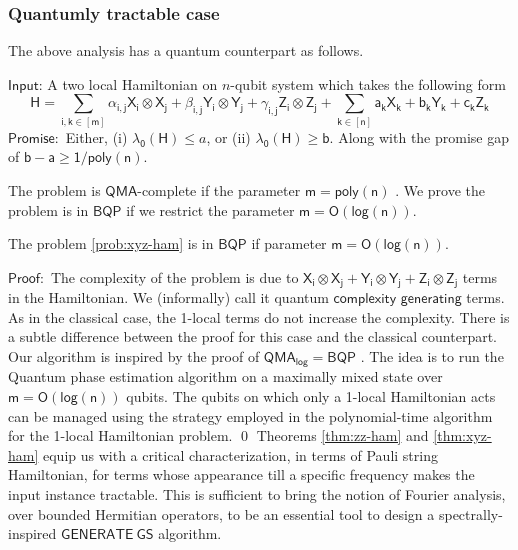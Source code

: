 \documentclass[11pt]{article}
\begin{document}
\subsubsection{Quantumly tractable case}
The above analysis has a quantum counterpart as follows. 
\begin{prob}
     $\mathsf{Input}$: A two local Hamiltonian on $n$-qubit system which takes the following form 
    \begin{equation}
        \mathsf{H=\sum_{i,k\in [m]}\alpha_{i,j}X_i \otimes X_j + \beta_{i,j} Y_i \otimes Y_j + \gamma_{i,j}Z_i \otimes Z_j+ \sum_{k\in [n]}a_k X_k +b_k Y_k + c_k Z_k} 
    \end{equation}
    $\mathsf{Promise}:$ Either, (i) $\mathsf{\lambda_0(H)}\leq a$, or (ii) $\mathsf{\lambda_0(H)\geq b}$. Along with the promise gap of $\mathsf{b-a \geq 1/poly(n)}$.
    \label{prob:xyz-ham}
\end{prob}
The problem is $\mathsf{QMA}$-complete if the parameter $\mathsf{m=poly(n)}$ \cite{cubitt2016complexity}. We prove the problem is in $\mathsf{BQP}$ if we restrict the parameter $\mathsf{m=O(log(n))}$. 
\begin{theorem}
The problem \ref{prob:xyz-ham} is in $\mathsf{BQP}$ if parameter $\mathsf{m=O(log(n))}$. \label{thm:xyz-ham}
\end{theorem}
$\mathsf{Proof:}$ The complexity of the problem is due to $\mathsf{X_i \otimes X_j + Y_i \otimes Y_j + Z_i \otimes Z_j}$ terms in the Hamiltonian. We (informally) call it quantum $\mathsf{complexity}$ $\mathsf{generating}$ terms. As in the classical case, the 1-local terms do not increase the complexity. There is a subtle difference between the proof for this case and the classical counterpart. Our algorithm is inspired by the proof of $\mathsf{QMA_{log} = BQP}$ \cite{marriott2005quantum}. The idea is to run the Quantum phase estimation algorithm on a maximally mixed state over $\mathsf{m=O(log(n))}$ qubits. The qubits on which only a 1-local Hamiltonian acts can be managed using the strategy employed in the polynomial-time algorithm for the 1-local Hamiltonian problem. \qed \newline
Theorems \ref{thm:zz-ham} and \ref{thm:xyz-ham} equip us with a critical characterization, in terms of Pauli string Hamiltonian, for terms whose appearance till a specific frequency makes the input instance tractable. This is sufficient to bring the notion of Fourier analysis, over bounded Hermitian operators, to be an essential tool to design a spectrally-inspired $\mathsf{GENERATE\ GS}$ algorithm. \newline
\end{document}
